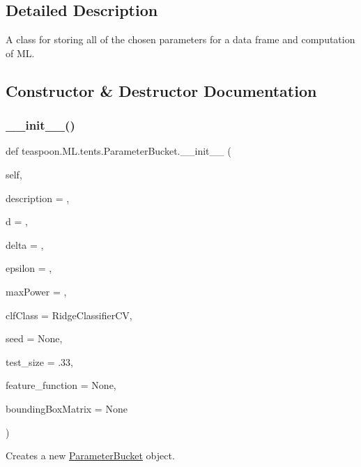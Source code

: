 \subsection{Detailed Description}
A class for storing all of the chosen parameters for a data frame and computation of ML.

\subsection{Constructor \& Destructor Documentation}
\mbox{\label{classteaspoon_1_1_m_l_1_1tents_1_1_parameter_bucket_a560cd613a020c1081f2ac0fa8caec4c5}}
\subsubsection{\texorpdfstring{\+\_\+\+\_\+init\+\_\+\+\_\+()}{\_\_init\_\_()}}
{\footnotesize\ttfamily def teaspoon.\+M\+L.\+tents.\+Parameter\+Bucket.\+\_\+\+\_\+init\+\_\+\+\_\+ (\begin{DoxyParamCaption}\item[{}]{self,  }\item[{}]{description = {\ttfamily \textquotesingle{}\textquotesingle{}},  }\item[{}]{d = {},  }\item[{}]{delta = {},  }\item[{}]{epsilon = {},  }\item[{}]{max\+Power = {},  }\item[{}]{clf\+Class = {\ttfamily RidgeClassifierCV},  }\item[{}]{seed = {\ttfamily None},  }\item[{}]{test\+\_\+size = {\ttfamily .33},  }\item[{}]{feature\+\_\+function = {\ttfamily None},  }\item[{}]{bounding\+Box\+Matrix = {\ttfamily None} }\end{DoxyParamCaption})}



Creates a new \hyperlink{classteaspoon_1_1_m_l_1_1tents_1_1_parameter_bucket}{Parameter\+Bucket} object.

